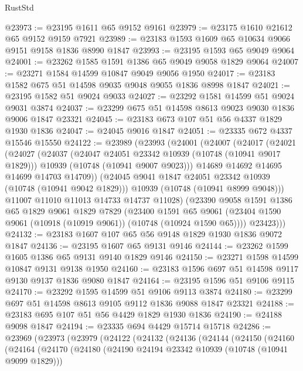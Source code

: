 \begin{lexlean}{RustStd}
\begin{coremodule}
{\begin{coremodule}
{{{{{@23973 := @23195 @1611 @65 @9152 @9161
@23979 := @23175 @1610 @21612 @65 @9152 @9159 @7921
@23989 := @23183 @1593 @1609 @65 @10634 @9066 @9151 @9158 @1836 @8990 @1847
@23993 := @23195 @1593 @65 @9049 @9064
@24001 := @23262 @1585 @1591 @1386 @65 @9049 @9058 @1829 @9064
@24007 := @23271 @1584 @14599 @10847 @9049 @9056 @1950
@24017 := @23183 @1582 @675 @51 @14598 @9035 @9048 @9055 @1836 @8998 @1847
@24021 := @23195 @1582 @51 @9024 @9033
@24027 := @23292 @1581 @14599 @51 @9024 @9031 @3874
@24037 := @23299 @675 @51 @14598 @8613 @9023 @9030 @1836 @9006 @1847 @23321
@24045 := @23183 @673 @107 @51 @56 @4337 @1829 @1930 @1836
@24047 := @24045 @9016 @1847
@24051 := @23335 @672 @4337 @15546 @15550
@24122 := @23989
    (@23993
      (@24001
        (@24007
          (@24017
            (@24021
              (@24027
                (@24037
                  (@24047 @24051 @23342 @10939 (@10748 (@10941 @9017 @1829)))
                  @10939
                  (@10748 (@10941 @9007 @9023)))
                @14689
                @14692
                @14695
                @14699
                @14703
                @14709))
            (@24045 @9041 @1847 @24051 @23342 @10939 (@10748 (@10941 @9042 @1829)))
            @10939
            (@10748 (@10941 @8999 @9048)))
          @11007
          @11010
          @11013
          @14733
          @14737
          @11028)
        (@23390
          @9058
          @1591
          @1386
          @65
          @1829
          @9061
          @1829
          @7829
          (@23400
            @1591
            @65
            @9061
            (@23404 @1590 @9061 (@10918 (@10919 @9061)) (@10748 (@10924 @1590 @65))))
          @23423)))
@24132 := @23183 @1607 @107 @65 @56 @9148 @1829 @1930 @1836 @9072 @1847
@24136 := @23195 @1607 @65 @9131 @9146
@24144 := @23262 @1599 @1605 @1386 @65 @9131 @9140 @1829 @9146
@24150 := @23271 @1598 @14599 @10847 @9131 @9138 @1950
@24160 := @23183 @1596 @697 @51 @14598 @9117 @9130 @9137 @1836 @9080 @1847
@24164 := @23195 @1596 @51 @9106 @9115
@24170 := @23292 @1595 @14599 @51 @9106 @9113 @3874
@24180 := @23299 @697 @51 @14598 @8613 @9105 @9112 @1836 @9088 @1847 @23321
@24188 := @23183 @695 @107 @51 @56 @4429 @1829 @1930 @1836
@24190 := @24188 @9098 @1847
@24194 := @23335 @694 @4429 @15714 @15718
@24286 := @23969
    (@23973
      (@23979
        (@24122
          (@24132
            (@24136
              (@24144
                (@24150
                  (@24160
                    (@24164
                      (@24170
                        (@24180
                          (@24190 @24194 @23342 @10939 (@10748 (@10941 @9099 @1829)))
}}}}}
\end{coremodule}}
\end{coremodule}
\end{lexlean}
